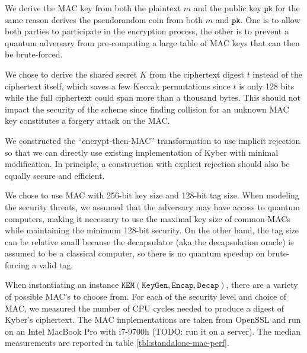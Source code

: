 \documentclass[floatrow,journal=tches,submission]{iacrtrans}
\newcommand{\keygen}{\texttt{KeyGen}}
\newcommand{\kem}{\texttt{KEM}}
\newcommand{\encap}{\texttt{Encap}}
\newcommand{\decap}{\texttt{Decap}}
\newcommand{\pk}{\texttt{pk}}
\begin{document}
\begin{remark}
    We derive the MAC key from both the plaintext $m$ and the public key $\pk$ for the same reason \cite{avanzi2019crystals} derives the pseudorandom coin from both $m$ and $\pk$. One is to allow both parties to participate in the encryption process, the other is to prevent a quantum adversary from pre-computing a large table of MAC keys that can then be brute-forced.
\end{remark}
\begin{remark}
    We chose to derive the shared secret $K$ from the ciphertext digest $t$ instead of the ciphertext itself, which saves a few Keccak permutations since $t$ is only 128 bits while the full ciphertext could span more than a thousand bytes. This should not impact the security of the scheme since finding collision for an unknown MAC key constitutes a forgery attack on the MAC.
\end{remark}
\begin{remark}
    We constructed the ``encrypt-then-MAC'' transformation to use implicit rejection so that we can directly use existing implementation of Kyber with minimal modification. In principle, a construction with explicit rejection should also be equally secure and efficient.
\end{remark}
\begin{remark}
    We chose to use MAC with 256-bit key size and 128-bit tag size. When modeling the security threats, we assumed that the adversary may have access to quantum computers, making it necessary to use the maximal key size of common MACs while maintaining the minimum 128-bit security. On the other hand, the tag size can be relative small because the decapsulator (aka the decapsulation oracle) is assumed to be a classical computer, so there is no quantum speedup on brute-forcing a valid tag.
\end{remark}

When instantiating an instance $\kem(\keygen, \encap, \decap)$, there are a variety of possible MAC's to choose from. For each of the security level and choice of MAC, we measured the number of CPU cycles needed to produce a digest of Kyber's ciphertext. The MAC implementations are taken from OpenSSL and run on an Intel MacBook Pro with i7-9700h (TODO: run it on a server). The median measurements are reported in table \ref{tbl:standalone-mac-perf}.
\end{document}
